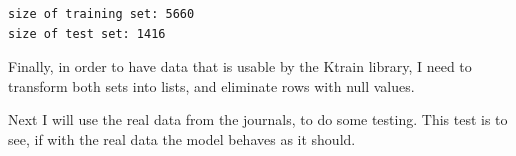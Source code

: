    \begin{Verbatim}[commandchars=\\\{\},fontsize=\small]
size of training set: 5660
size of test set: 1416
    \end{Verbatim}

Finally, in order to have data that is usable by the \gls{Ktrain} library, I need to transform both sets into lists, and eliminate rows with null values.

Next I will use the real data from the journals, to do some testing. This test is to see, if with the real data the model behaves as it should. 